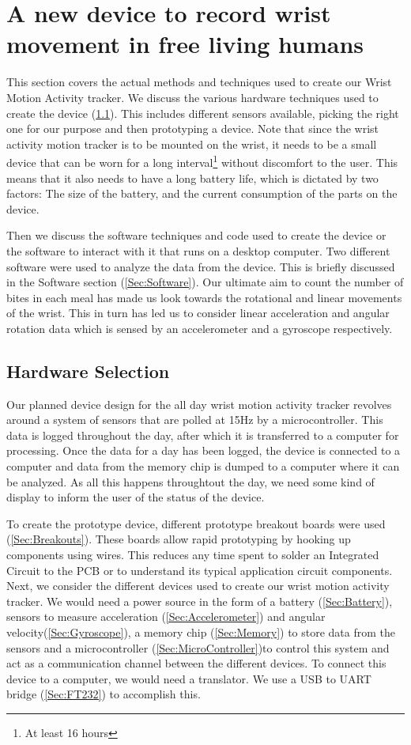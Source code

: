 \chapter{A new device to record wrist movement in free living humans}
\label{Chap:Methods}
This section covers the actual methods and techniques used to create our Wrist 
Motion Activity tracker. We discuss the various hardware techniques used to 
create the device (\ref{Sec:Hardware}). This includes different sensors available,
picking the right one for our purpose and then prototyping a device. Note that
since the wrist activity motion tracker is to be mounted on the wrist, it needs
to be a small device that can be worn for a long interval\footnote{At least
16 hours} without discomfort to the user. This means that it also needs to
have a long battery life, which is dictated by two factors: The size of the 
battery, and the current consumption of the parts on the device.

Then we discuss the software techniques and code used to create the device or the software to interact with it that runs on a desktop computer. Two different software were used to analyze the data from the device. This is briefly discussed in the Software section (\ref{Sec:Software}). Our ultimate aim to count the number of bites in each meal has made us look towards the rotational and linear movements of the wrist. This in turn has led us to consider linear acceleration and angular rotation data which is sensed by an accelerometer and a gyroscope respectively.

\section{Hardware Selection}
\label{Sec:Hardware}
Our planned device design for the all day wrist motion activity tracker revolves around a system of sensors that are polled at 15Hz by a microcontroller. This data is logged throughout the day, after which it is transferred to a computer for processing. Once the data for a day has been logged, the device is connected to a computer and data from the memory chip is dumped to a computer where it can be analyzed. As all this happens throughtout the day, we need some kind of display to inform the user of the status of the device.

To create the prototype device, different prototype breakout boards were used (\ref{Sec:Breakouts}). These boards allow rapid prototyping by hooking up components using wires. This reduces any time spent to solder an Integrated Circuit to the PCB or to understand its typical application circuit components. Next, we consider the different devices used to create our wrist motion activity tracker. We would need a power source in the form of a battery (\ref{Sec:Battery}), sensors to measure acceleration (\ref{Sec:Accelerometer}) and angular velocity(\ref{Sec:Gyroscope}), a memory chip (\ref{Sec:Memory}) to store data from the sensors and a microcontroller (\ref{Sec:MicroController})to control this system and act as a communication channel between the different devices. To connect this device to a computer, we would need a translator. We use a USB to UART bridge (\ref{Sec:FT232}) to accomplish this.

